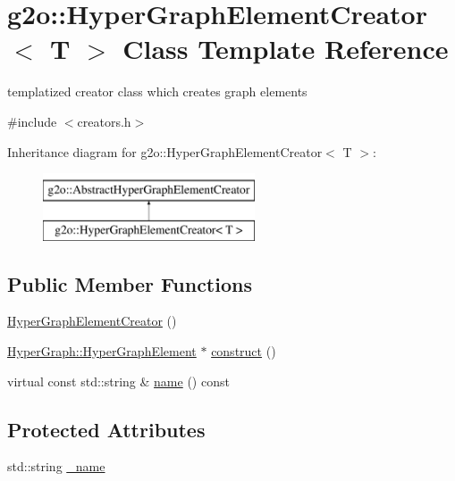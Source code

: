 \hypertarget{classg2o_1_1_hyper_graph_element_creator}{}\section{g2o\+:\+:Hyper\+Graph\+Element\+Creator$<$ T $>$ Class Template Reference}
\label{classg2o_1_1_hyper_graph_element_creator}


templatized creator class which creates graph elements  




{\ttfamily \#include $<$creators.\+h$>$}

Inheritance diagram for g2o\+:\+:Hyper\+Graph\+Element\+Creator$<$ T $>$\+:\begin{figure}[H]
\begin{center}
\leavevmode
\includegraphics[height=2.000000cm]{classg2o_1_1_hyper_graph_element_creator}
\end{center}
\end{figure}
\subsection*{Public Member Functions}
\begin{DoxyCompactItemize}
\item 
\mbox{\hyperlink{classg2o_1_1_hyper_graph_element_creator_aacaa6cfc040649e5802bfe07240f242f}{Hyper\+Graph\+Element\+Creator}} ()
\item 
\mbox{\hyperlink{structg2o_1_1_hyper_graph_1_1_hyper_graph_element}{Hyper\+Graph\+::\+Hyper\+Graph\+Element}} $\ast$ \mbox{\hyperlink{classg2o_1_1_hyper_graph_element_creator_af5e58366dd05b49700076e0c4ace31e3}{construct}} ()
\item 
virtual const std\+::string \& \mbox{\hyperlink{classg2o_1_1_hyper_graph_element_creator_a9350df173e72ccb4bb6594d282a2c0e7}{name}} () const
\end{DoxyCompactItemize}
\subsection*{Protected Attributes}
\begin{DoxyCompactItemize}
\item 
std\+::string \mbox{\hyperlink{classg2o_1_1_hyper_graph_element_creator_abbcc42de74a57d80b586dd843255ebae}{\+\_\+name}}
\end{DoxyCompactItemize}



